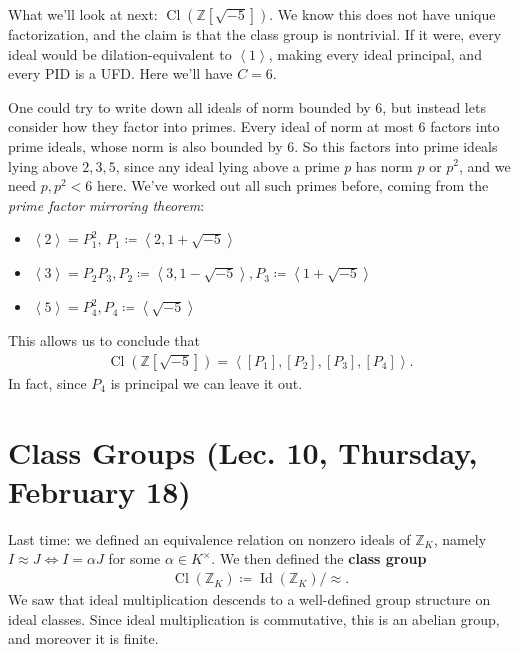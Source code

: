 \begin{example}[?]

What we'll look at next:
\(\operatorname{Cl}( {\mathbb{Z}}[ \sqrt{-5} ])\). We know this does not
have unique factorization, and the claim is that the class group is
nontrivial. If it were, every ideal would be dilation-equivalent to
\(\left\langle{ 1 }\right\rangle\), making every ideal principal, and
every PID is a UFD. Here we'll have \(C=6\).

\hfill\break

One could try to write down all ideals of norm bounded by 6, but instead
lets consider how they factor into primes. Every ideal of norm at most 6
factors into prime ideals, whose norm is also bounded by 6. So this
factors into prime ideals lying above \(2,3,5\), since any ideal lying
above a prime \(p\) has norm \(p\) or \(p^2\), and we need
\(p, p^2 < 6\) here. We've worked out all such primes before, coming
from the \emph{prime factor mirroring theorem}:

\begin{itemize}
\tightlist
\item
  \(\left\langle{ 2 }\right\rangle= P_1^2,\, P_1 \coloneqq\left\langle{ 2, 1 + \sqrt{-5} }\right\rangle\)
\item
  \(\left\langle{ 3 }\right\rangle = P_2 P_3, P_2 \coloneqq\left\langle{ 3, 1 - \sqrt{-5} }\right\rangle, P_3 \coloneqq\left\langle{ 1 + \sqrt{-5} }\right\rangle\)
\item
  \(\left\langle{ 5 }\right\rangle= P_4^2, P_4 \coloneqq\left\langle{ \sqrt{-5} }\right\rangle\)
\end{itemize}

This allows us to conclude that
\begin{align*}
\operatorname{Cl}({\mathbb{Z}}[ \sqrt{-5} ]) = \left\langle{ [P_1], [P_2], [P_3], [P_4] }\right\rangle
.\end{align*}
In fact, since \(P_4\) is principal we can leave it out.

\end{example}

\hypertarget{class-groups-lec.-10-thursday-february-18}{%
\section{Class Groups (Lec. 10, Thursday, February
18)}\label{class-groups-lec.-10-thursday-february-18}}

\begin{remark}

Last time: we defined an equivalence relation on nonzero ideals of
\({\mathbb{Z}}_K\), namely \(I \approx J \iff I = \alpha J\) for some
\(\alpha \in K^{\times}\). We then defined the \textbf{class group}
\begin{align*}
\operatorname{Cl}({\mathbb{Z}}_K) \coloneqq\operatorname{Id}({\mathbb{Z}}_K) / \approx
.\end{align*}
We saw that ideal multiplication descends to a well-defined group
structure on ideal classes. Since ideal multiplication is commutative,
this is an abelian group, and moreover it is finite.

\end{remark}

